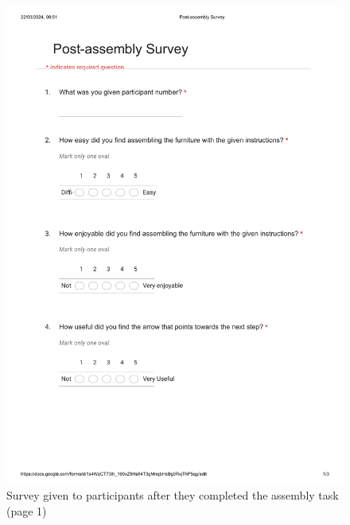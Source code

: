 \documentclass{l4proj}
\begin{document}
\begin{appendices}
\begin{figure}
    \centering
    \includegraphics[width=1\linewidth]{dissertation//images/postAssemblySurvey.pdf}
    \caption{Survey given to participants after they completed the assembly task (page 1)}
\end{figure}


\end{appendices}
\end{document}
